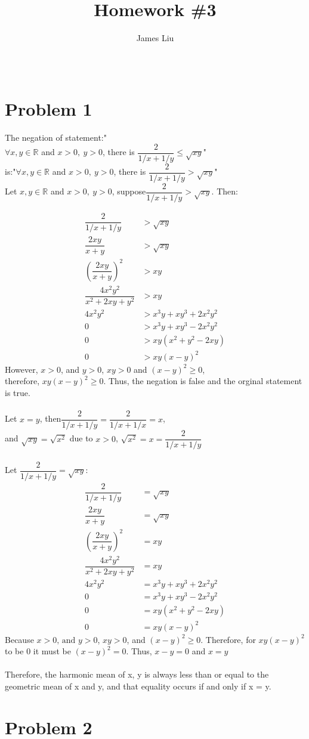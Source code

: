 \documentclass[a4paper]{article}
\title{\textbf{Homework \#3 }}
\author{James Liu}
\date{\ }
\begin{document}
\maketitle

\section*{Problem 1}
    The negation of statement:"\\
    \(\forall x,y\in \mathbb{R}\) and \(x>0,\ y>0\), there is \(\dfrac{2}{1/x+1/y} \leqslant \sqrt{xy}\)"\\
    is:"\(\forall x,y\in \mathbb{R}\) and \(x>0,\ y>0\), there is \(\dfrac{2}{1/x+1/y} >\sqrt{xy}\)"
    \\
    Let \(x,y\in \mathbb{R}\) and \(x>0,\ y>0\), suppose\(\dfrac {2}{1/x+1/y}> \sqrt{xy}\). Then:

    \begin{align*}
        \dfrac {2}{1/x+1/y}&> \sqrt{xy}\\
        \dfrac{2xy}{x+y}&>\sqrt{xy}\\
        \left( \dfrac{2xy}{x+y}\right)^2 &>xy\\
        \dfrac{4x^2y^2}{x^2+2xy+y^2}&>xy\\
        4x^2y^2&>x^3y+xy^3+2x^2y^2\\
        0&>x^3y+xy^3-2x^2y^2\\
        0&>xy(x^2+y^2-2xy)\\
        0&>xy(x-y)^2
    \end{align*}
    However, \(x>0\), and \(y>0\), \(xy>0\) and \((x-y)^2\geqslant 0\),\\
    therefore, \(xy(x-y)^2\geqslant 0\). Thus, the negation is false and the orginal statement is true.
    \\
    \\
    Let \(x=y\), then\(\dfrac{2}{1/x+1/y} = \dfrac{2}{1/x+1/x}=x\),\\
    and \(\sqrt{xy}=\sqrt{x^2}\) due to \(x>0\), \(\sqrt{x^2}=x=\dfrac{2}{1/x+1/y}\)
    \\
    \\
    Let \(\dfrac{2}{1/x+1/y} = \sqrt{xy}\):
    \begin{align*}
        \dfrac {2}{1/x+1/y}&= \sqrt{xy}\\
        \dfrac{2xy}{x+y}&=\sqrt{xy}\\
        \left( \dfrac{2xy}{x+y}\right)^2 &=xy\\
        \dfrac{4x^2y^2}{x^2+2xy+y^2}&=xy\\
        4x^2y^2&=x^3y+xy^3+2x^2y^2\\
        0&=x^3y+xy^3-2x^2y^2\\
        0&=xy(x^2+y^2-2xy)\\
        0&=xy(x-y)^2
    \end{align*}
    Because \(x>0\text{, and }y>0\), \(xy>0\), and \((x-y)^2\geqslant 0\). Therefore, for \(xy(x-y)^2\) to be \(0\)
    it must be \((x-y)^2=0\). Thus, \(x-y=0\) and \(x=y\)\\
    \\
    Therefore, the harmonic mean of x, y is always less than or equal to the geometric
    mean of x and y, and that equality occurs if and only if x = y.
\section*{Problem 2}
    
\end{document}
